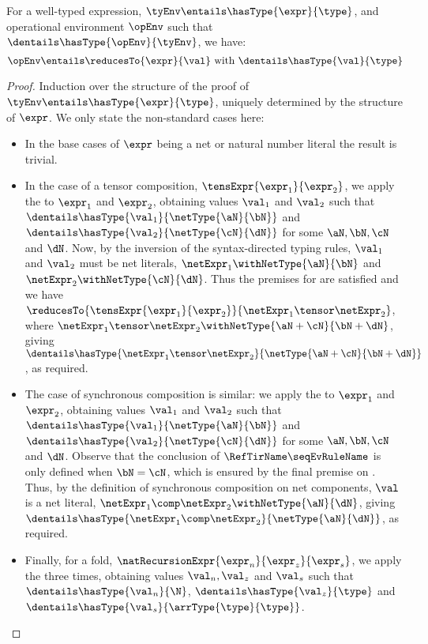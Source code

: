 \begin{theorem}\label{thm:typeSafety}
    For a well-typed expression, $\tyEnv \entails \hasType{\expr}{\type}$, and
    operational environment $\opEnv$ such that $\dentails
    \hasType{\opEnv}{\tyEnv}$, we have:
    \[
        \opEnv \entails \reducesTo{\expr}{\val}
        \text{ with } \dentails \hasType{\val}{\type}
    \]
\end{theorem}
\begin{proof}
    Induction over the structure of the proof of $\tyEnv \entails
    \hasType{\expr}{\type}$, uniquely determined by the structure of $\expr$.
    We only state the non-standard cases here:
    \begin{itemize}
        \item In the base cases of $\expr$ being a net or natural number
            literal the result is trivial.
        \item In the case of a tensor composition,
            $\tensExpr{\expr_1}{\expr_2}$, we apply the \IH{} to $\expr_1$ and
            $\expr_2$, obtaining values $\val_1$ and $\val_2$ such that
            $\dentails \hasType{\val_1}{\netType{\aN}{\bN}}$ and
            $\dentails \hasType{\val_2}{\netType{\cN}{\dN}}$ for some $\aN,
            \bN, \cN$ and $\dN$. Now, by the inversion of the syntax-directed
            typing rules, $\val_1$ and $\val_2$ must be net
            literals, $\netExpr_1 \withNetType{\aN}{\bN}$ and $\netExpr_2
            \withNetType{\cN}{\dN}$. Thus the premises for
            \inferenceRule{\tenEvRuleName} are satisfied and we have
            $\reducesTo{\tensExpr{\expr_1}{\expr_2}}{\netExpr_1 \tensor
            \netExpr_2}$, where $\netExpr_1 \tensor \netExpr_2 \withNetType{\aN
            + \cN}{\bN + \dN}$, giving $\dentails \hasType{\netExpr_1 \tensor
            \netExpr_2}{\netType{\aN + \cN}{\bN + \dN}}$, as required.
        \item The case of synchronous composition is similar:
            we apply the \IH{} to $\expr_1$ and
            $\expr_2$, obtaining values $\val_1$ and $\val_2$ such that
            $\dentails \hasType{\val_1}{\netType{\aN}{\bN}}$ and
            $\dentails \hasType{\val_2}{\netType{\cN}{\dN}}$ for some $\aN,
            \bN, \cN$ and $\dN$. Observe that the conclusion of
            $\inferenceRule{\seqEvRuleName}$ is only defined when $\bN = \cN$,
            which is ensured by the final premise on
            \inferenceRule{\seqTyRuleName}. Thus, by the definition of
            synchronous composition on net components, $\val$ is a net literal,
            $\netExpr_1 \comp \netExpr_2 \withNetType{\aN}{\dN}$, giving
            $\dentails \hasType{\netExpr_1 \comp
            \netExpr_2}{\netType{\aN}{\dN}}$, as required.
        \item Finally, for a fold,
            $\natRecursionExpr{\expr_n}{\expr_z}{\expr_s}$, we apply the \IH{}
            three times, obtaining values $\val_n, \val_z$ and $\val_s$ such
            that $\dentails \hasType{\val_n}{\N}$, $\dentails
            \hasType{\val_z}{\type}$ and $\dentails
            \hasType{\val_s}{\arrType{\type}{\type}}$.


\end{itemize}
\end{proof}
